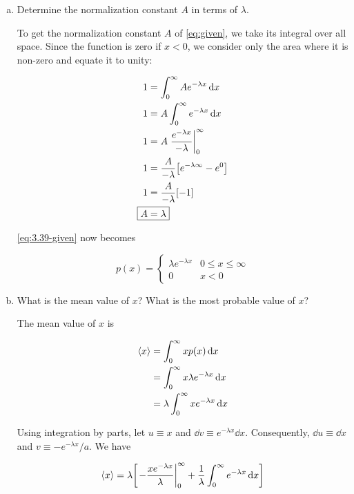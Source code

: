 \documentclass[9pt,a4paper,twocolumn]{article}
\begin{document}
\begin{enumerate}[(a)]

\item Determine the normalization constant $A$ in terms of $\lambda$.

To get the normalization constant $A$ of \eqref{eq:given}, we take its integral over all space. Since the function is zero if $x < 0$, we consider only the area where it is non-zero and equate it to unity:

\begin{align}
	1 &= \int_0^\infty Ae^{-\lambda x} \dd{x} \\
	1 &= A\int_0^\infty e^{-\lambda x}\dd{x} \nonumber \\
	1 &= A\eval{\frac{e^{-\lambda x}}{-\lambda}}_0^\infty \nonumber \\
	1 &= \frac{A}{-\lambda}\qty[e^{-\lambda\infty} - e^0] \nonumber \\
	1 &= \frac{A}{-\lambda}\qty[-1] \nonumber \\
	\Aboxed{
		A &= \lambda
	} \label{eq:answer-a}
\end{align}

\eqref{eq:3.39-given} now becomes

\begin{equation}\label{eq:given-normed}
	p(x) =
	\begin{cases}
		\lambda e^{-\lambda x} & 0 \leq x \leq \infty \\
		0 & x < 0
	\end{cases}
\end{equation}

\item What is the mean value of $x$? What is the most probable value of $x$?

The mean value of $x$ is

\begin{align}
	\ev{x} &= \int_0^\infty x p(x) \dd{x} \\
	&= \int_0^\infty x\lambda e^{-\lambda x} \dd{x} \nonumber \\
	&= \lambda \int_0^\infty xe^{-\lambda x} \dd{x}
\end{align}

Using integration by parts, let $u \equiv x$ and $\dd{v} \equiv e^{-\lambda x}\dd{x}$. Consequently, $\dd{u} \equiv \dd{x}$ and $v \equiv -e^{-\lambda x}/a$. We have

\begin{equation}\label{eq:ibp}
	\ev{x} = \lambda\qty[\eval{-\frac{xe^{-\lambda x}}{\lambda}}_0^\infty + \frac{1}{\lambda}\int_0^\infty e^{-\lambda x}\dd{x}]
\end{equation}


\end{enumerate}
\end{document}
